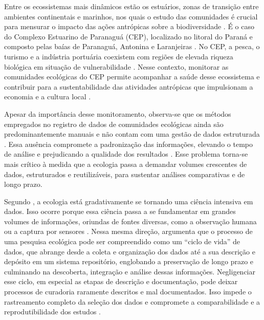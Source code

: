 \documentclass[
	12pt,				%
	oneside,			%
	a4paper,			%
	chapter=TITLE,		%
	section=TITLE,		%
	subsection=TITLE,	%
	subsubsection=TITLE,%
	english,			%
	french,				%
	spanish,			%
	brazilian,				%
	]{abntex2}
\begin{document}
Entre os ecossistemas mais dinâmicos estão os estuários, zonas de transição entre ambientes continentais e marinhos, nos quais o estudo das comunidades é crucial para mensurar o impacto das ações antrópicas sobre a biodiversidade \cite{whitfield_fishes_2002}.
É o caso do Complexo Estuarino de Paranaguá (CEP), localizado no litoral do Paraná e composto pelas baías de Paranaguá, Antonina e Laranjeiras \cite{angeli_arsenic_2013}. No CEP, a pesca, o turismo e a indústria portuária coexistem com regiões de elevada riqueza biológica em situação de vulnerabilidade \cite{miura_mapping_2020}.
Nesse contexto, monitorar as comunidades ecológicas do CEP permite acompanhar a saúde desse ecossistema e contribuir para a sustentabilidade das atividades antrópicas que impulsionam a economia e a cultura local \cite{andriguetto_filho_diagnostico_2006,miura_mapping_2020}.

Apesar da importância desse monitoramento, observa-se que os métodos empregados no registro de dados de comunidades ecológicas ainda são predominantemente manuais e não contam com uma gestão de dados estruturada \cite{angeli_arsenic_2013,liebezeit_ddt_2011,santos_diversidade_2024}.
Essa ausência compromete a padronização das informações, elevando o tempo de análise e prejudicando a qualidade dos resultados \cite{specht_data_2015}.
Esse problema torna-se mais crítico à medida que a ecologia passa a demandar volumes crescentes de dados, estruturados e reutilizáveis, para sustentar análises comparativas e de longo prazo.

Segundo , a ecologia está gradativamente se tornando uma ciência intensiva em dados. Isso ocorre porque essa ciência passa a se fundamentar em grandes volumes de informações, oriundas de fontes diversas, como a observação humana ou a captura por sensores \cite{kelling_data-intensive_2009}.
Nessa mesma direção,  argumenta que o processo de uma pesquisa ecológica pode ser compreendido como um ``ciclo de vida'' de dados, que abrange desde a coleta e organização dos dados até a sua descrição e depósito em um sistema repositório, englobando a preservação de longo prazo e culminando na descoberta, integração e análise dessas informações.
Negligenciar esse ciclo, em especial as etapas de descrição e documentação, pode deixar processos de curadoria raramente descritos e mal documentados. Isso impede o rastreamento completo da seleção dos dados e compromete a comparabilidade e a reprodutibilidade dos estudos \cite{ronquillo_occur_2024}.
\end{document}
